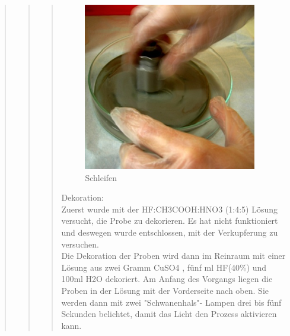 \begin{quote}
\begin{quote}
\begin{quote}
   			\vspace{2em}
    		
    		\begin{figure}[H]
				\hspace{3 cm}
                  \includegraphics[scale=1, trim = 0cm 0cm 0cm 0cm,clip]
                	{./HerstellungBilder/Schleifen.png}
                  \caption{Schleifen}
                \label{fig:schlei}
            \end{figure}
            
    		\vspace{2em}   	
    	
    		Dekoration:\\

			Zuerst wurde mit der HF:CH3COOH:HNO3 (1:4:5) Lösung versucht, die 
			Probe zu dekorieren. Es hat nicht funktioniert und deswegen wurde 
			entschlossen, mit der Verkupferung zu versuchen.\\

			Die Dekoration der Proben wird dann im Reinraum mit einer Lösung aus 
			zwei Gramm CuSO4 , fünf ml HF(40\%) und 100ml H2O dekoriert. Am 
			Anfang des Vorgangs liegen die Proben in der Lösung mit der 
			Vorderseite nach oben. Sie werden dann mit zwei "Schwanenhals"-
			Lampen drei bis fünf Sekunden belichtet, damit das Licht den Prozess
			aktivieren kann.
    		
    		\vspace{2em}
    		

\end{quote}
\end{quote}
\end{quote}
